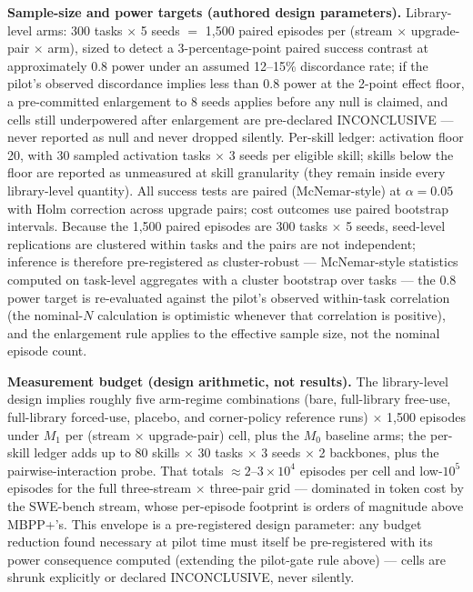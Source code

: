 \documentclass[11pt]{article}
\begin{document}
\textbf{Sample-size and power targets (authored design parameters).} Library-level arms: 300 tasks $\times$ 5 seeds $=$ 1{,}500 paired episodes per (stream $\times$ upgrade-pair $\times$ arm), sized to detect a 3-percentage-point paired success contrast at approximately 0.8 power under an assumed 12--15\% discordance rate; if the pilot's observed discordance implies less than 0.8 power at the 2-point effect floor, a pre-committed enlargement to 8 seeds applies before any null is claimed, and cells still underpowered after enlargement are pre-declared INCONCLUSIVE --- never reported as null and never dropped silently. Per-skill ledger: activation floor 20, with 30 sampled activation tasks $\times$ 3 seeds per eligible skill; skills below the floor are reported as unmeasured at skill granularity (they remain inside every library-level quantity). All success tests are paired (McNemar-style) at $\alpha = 0.05$ with Holm correction across upgrade pairs; cost outcomes use paired bootstrap intervals. Because the 1{,}500 paired episodes are 300 tasks $\times$ 5 seeds, seed-level replications are clustered within tasks and the pairs are not independent; inference is therefore pre-registered as cluster-robust --- McNemar-style statistics computed on task-level aggregates with a cluster bootstrap over tasks --- the 0.8 power target is re-evaluated against the pilot's observed within-task correlation (the nominal-$N$ calculation is optimistic whenever that correlation is positive), and the enlargement rule applies to the effective sample size, not the nominal episode count.

\textbf{Measurement budget (design arithmetic, not results).} The library-level design implies roughly five arm-regime combinations (bare, full-library free-use, full-library forced-use, placebo, and corner-policy reference runs) $\times$ 1{,}500 episodes under $M_1$ per (stream $\times$ upgrade-pair) cell, plus the $M_0$ baseline arms; the per-skill ledger adds up to 80 skills $\times$ 30 tasks $\times$ 3 seeds $\times$ 2 backbones, plus the pairwise-interaction probe. That totals ${\approx}2$--$3 \times 10^{4}$ episodes per cell and low-$10^{5}$ episodes for the full three-stream $\times$ three-pair grid --- dominated in token cost by the SWE-bench stream, whose per-episode footprint is orders of magnitude above MBPP+'s. This envelope is a pre-registered design parameter: any budget reduction found necessary at pilot time must itself be pre-registered with its power consequence computed (extending the pilot-gate rule above) --- cells are shrunk explicitly or declared INCONCLUSIVE, never silently.
\end{document}
